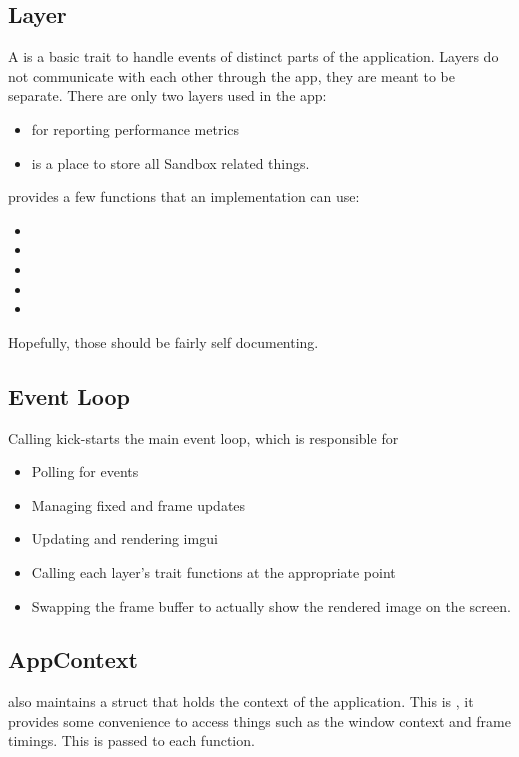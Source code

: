 \subsection{Layer}
A  is a basic trait to handle events of distinct parts of the application.
Layers do not communicate with each other through the app, they are meant to be separate.
There are only two layers used in the app:
\begin{itemize}
  \item {} for reporting performance metrics
  \item {} is a place to store all Sandbox related things.
\end{itemize}
 provides a few functions that an implementation can use:
\begin{itemize}
  \item {}
  \item {}
  \item {}
  \item {}
  \item {}
\end{itemize}

Hopefully, those should be fairly self documenting.

\subsection{Event Loop}
Calling  kick-starts the main event loop, which is responsible for
\begin{itemize}
  \item Polling for events
  \item Managing fixed and frame updates
  \item Updating and rendering imgui
  \item Calling each layer's  trait functions at the appropriate point
  \item Swapping the frame buffer to actually show the rendered image on the screen.
\end{itemize}

\subsection{AppContext}
 also maintains a struct that holds the context of the application.
This is , it provides some convenience to access things such as the window context and frame timings.
This is passed to each  function.


